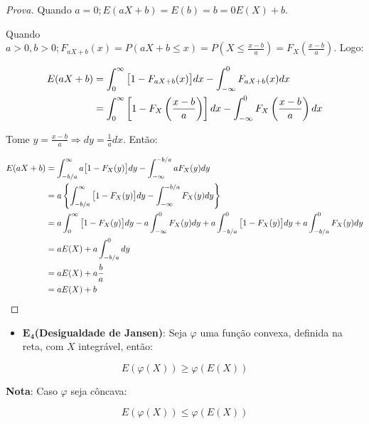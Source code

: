 \documentclass[
]{article}
\providecommand{\tightlist}{%
  \setlength{\itemsep}{0pt}\setlength{\parskip}{0pt}}
\theoremstyle{definition}
\theoremstyle{definition}
\theoremstyle{definition}
\theoremstyle{definition}
\theoremstyle{remark}
\begin{document}
\begin{proof}[Prova]
Quando \(a = 0; E(aX + b) = E(b) = b = 0E(X) + b\).

Quando \(a > 0, b > 0; F_{aX + b}(x) = P(aX+b \le x) = P\left(X \le \frac{x-b}{a}\right) = F_{X}\left(\frac{x-b}{a}\right)\). Logo:

\begin{align*}
E(aX + b) &= \int_{0}^{\infty}\big{[}1 - F_{aX + b}(x)\big{]}dx - \int_{-\infty}^{0}F_{aX + b}(x)dx \\
&= \int_{0}^{\infty}\left[1 - F_{X}\left(\frac{x-b}{a}\right)\right]dx - \int_{-\infty}^{0}F_{X}\left(\frac{x-b}{a}\right)dx
\end{align*}

Tome \(y = \frac{x-b}{a} \Rightarrow dy = \frac{1}{a}dx\). Então:

\begin{align*}
E(aX+b) &= \int_{-b/a}^{\infty}a\big{[}1 - F_{X}(y)\big{]}dy - \int_{-\infty}^{-b/a}aF_{X}(y)dy \\
&= a\left\{\int_{-b/a}^{\infty}\big{[}1 - F_{X}(y)\big{]}dy - \int_{-\infty}^{-b/a}F_{X}(y)dy\right\} \\
&= a\int_{0}^{\infty}\big{[}1 - F_{X}(y)\big{]}dy - a\int_{-\infty}^{0}F_{X}(y)dy + a\int_{-b/a}^{0}\big{[}1 - F_{X}(y)\big{]}dy + a\int_{-b/a}^{0}F_{X}(y)dy \\
&= aE(X) + a \int_{-b/a}^{0}dy \\
&= aE(X) + a \frac{b}{a} \\
&= aE(X) + b
\end{align*}
\end{proof}

\begin{itemize}
\tightlist
\item
  \(\mathbf{E_{4}}\)\textbf{(Desigualdade de Jansen)}: Seja \(\varphi\) uma função convexa, definida na reta, com \(X\) integrável, então:
\end{itemize}

\begin{equation}
E(\varphi(X)) \ge \varphi(E(X))
\label{eq:desigjansen}
\end{equation}

\textbf{Nota}: Caso \(\varphi\) seja côncava:

\begin{equation*}
E(\varphi(X)) \le \varphi(E(X))
\end{equation*}
\end{document}
